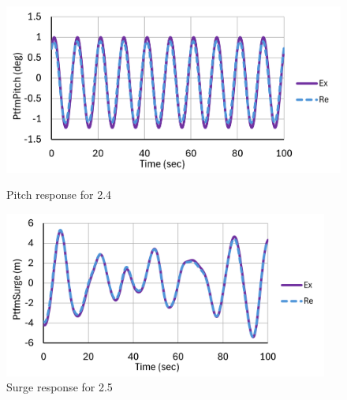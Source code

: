 \documentclass[a4paper, 11pt]{article}
\begin{document}
\begin{figure}[H]
    \begin{minipage}{0.48\textwidth}
        \centering
        \includegraphics[width=1\textwidth]{2.4_pitch_mine.png}
        \caption{\small Pitch response for 2.4}
        \label{fig:2.4_pitch_mine_recreated}
    \end{minipage}
    \hfill
    \begin{minipage}{0.5\textwidth}
        \centering
        \includegraphics[width=0.95\textwidth]{2.5_surge_mine.png}
        \caption{\small Surge response for 2.5}
        \label{fig:2.5_surge_mine_recreated}
    \end{minipage}
\end{figure}
\end{document}
